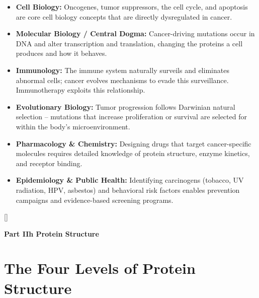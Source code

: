 \documentclass[11pt, letterpaper]{article}
\newcommand{\bluesections}{%
  \titleformat{\section}{\large\bfseries\color{sectionblue}}{}{0em}{}[\color{sectionblue}\titlerule]%
  \titleformat{\subsection}{\normalsize\bfseries\color{sectionblue!80!black}}{}{0em}{}%
}
\newcommand{\partbanner}[3]{%
  \begin{tcolorbox}[colback=#1, colframe=#2, boxrule=1.2pt, arc=4pt,
    left=8pt, right=8pt, top=6pt, bottom=6pt]
    \begin{center}{\LARGE\bfseries #3}\end{center}
  \end{tcolorbox}%
}
\begin{document}
\begin{tcolorbox}[colback=partbg, colframe=sectionblue, arc=3pt, boxrule=1pt]
\begin{itemize}[noitemsep, leftmargin=*]
  \item \textbf{Cell Biology:} Oncogenes, tumor suppressors, the cell cycle, and apoptosis are core cell biology concepts that are directly dysregulated in cancer.
  \item \textbf{Molecular Biology / Central Dogma:} Cancer-driving mutations occur in DNA and alter transcription and translation, changing the proteins a cell produces and how it behaves.
  \item \textbf{Immunology:} The immune system naturally surveils and eliminates abnormal cells; cancer evolves mechanisms to evade this surveillance. Immunotherapy exploits this relationship.
  \item \textbf{Evolutionary Biology:} Tumor progression follows Darwinian natural selection -- mutations that increase proliferation or survival are selected for within the body's microenvironment.
  \item \textbf{Pharmacology \& Chemistry:} Designing drugs that target cancer-specific molecules requires detailed knowledge of protein structure, enzyme kinetics, and receptor binding.
  \item \textbf{Epidemiology \& Public Health:} Identifying carcinogens (tobacco, UV radiation, HPV, asbestos) and behavioral risk factors enables prevention campaigns and evidence-based screening programs.
\end{itemize}
\end{tcolorbox}


\bluesections
{}
\partbanner{partbg}{sectionblue}{Part IIh \quad Protein Structure}

\vspace{8pt}

\section*{The Four Levels of Protein Structure}
\end{document}
